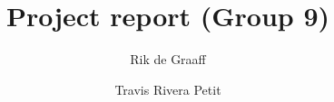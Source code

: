 \title{Project report (Group 9)} %
\author{Rik de Graaff \and Travis Rivera Petit} %

\institute{\lectureInstitute} %
\begin{report}











\end{report}
